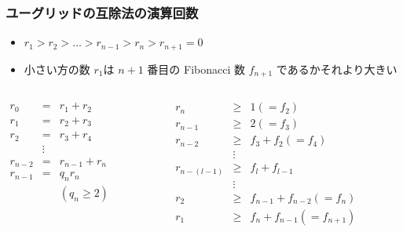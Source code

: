 \begin{frame}
\frametitle{ユーグリッドの互除法の演算回数}
  \begin{itemize}
\item \(r_1>r_2>\ldots>r_{n-1}>r_n>r_{n+1}=0\)
\item 小さい方の数 \(r_1\)は \(n+1\) 番目の Fibonacci 数 \(f_{n+1}\) であるかそれより大きい
  \end{itemize}
  \begin{columns}[t]
    \begin{column}{0.45\textwidth}
\centering
      \begin{math}
        \begin{array}{rcl}
r_0 &=& r_1 + r_2\\
r_1 &=& r_2 + r_3\\
r_2 &=& r_3 + r_4\\
&\vdots&\\
r_{n-2} &=& r_{n-1} + r_{n}\\
r_{n-1} &=& q_{n}r_{n}\\
         && (q_n\ge 2)
        \end{array}
      \end{math}
    \end{column}
    \begin{column}{0.45\textwidth}
\centering
      \begin{math}
        \begin{array}{rcl}
r_n     &\ge& 1(=f_2)\\
r_{n-1} &\ge& 2(=f_3)\\
r_{n-2} &\ge& f_3+f_2(=f_4)\\
 &\vdots& \\
 r_{n-(l-1)}&\ge& f_l+f_{l-1}\\
 &\vdots& \\
r_{2} &\ge& f_{n-1}+f_{n-2}(=f_n)\\
r_{1} &\ge& f_n+f_{n-1}(=f_{n+1})\\
        \end{array}
      \end{math}
    \end{column}
  \end{columns}
\end{frame}
